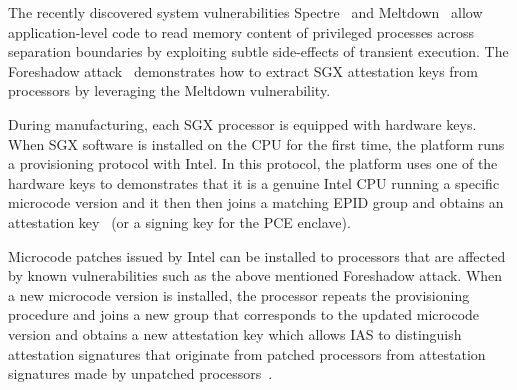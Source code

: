 The recently discovered system vulnerabilities Spectre~\cite{Kocher2018spectre} and Meltdown~\cite{Lipp2018meltdown} allow application-level code to read memory content of privileged processes across separation boundaries by exploiting subtle side-effects of transient execution. The Foreshadow attack~\cite{foreshadow-usenix18} demonstrates how to extract SGX attestation keys from processors by leveraging the Meltdown vulnerability. 

\parasaverL
{}
During manufacturing, each SGX processor is equipped with hardware keys. When SGX software is installed on the CPU for the first time, the platform runs a provisioning protocol with Intel. In this protocol, the platform uses one of the hardware keys to demonstrates that it is a genuine Intel CPU running a specific microcode version and it then then joins a matching EPID group and obtains an attestation key~\cite{epid_attestation} (or a signing key for the PCE enclave). 

Microcode patches issued by Intel can be installed to processors that are affected by known vulnerabilities such as the above mentioned Foreshadow attack. When a new microcode version is installed, the processor repeats the provisioning procedure and joins a new group that corresponds to the updated microcode version and obtains a new attestation key which allows IAS to distinguish attestation signatures that originate from patched processors from attestation signatures made by unpatched processors~\cite{epid_attestation}.